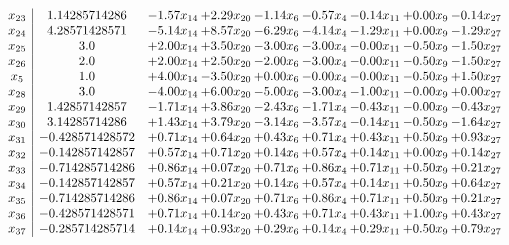 \documentclass[8pt]{article}
\begin{document}
\[\begin{array}{c| c c@{\hskip 2pt} c@{\hskip 2pt} c@{\hskip 2pt} c@{\hskip 2pt} c@{\hskip 2pt} c@{\hskip 2pt} c@{\hskip 2pt} }
 x_{23}   &  1.14285714286 & -1.57 x_{14} & +  2.29 x_{20} & -1.14 x_{6} & -0.57 x_{4} & -0.14 x_{11} & +  0.00 x_{9} & -0.14 x_{27}\\
 x_{24}   &  4.28571428571 & -5.14 x_{14} & +  8.57 x_{20} & -6.29 x_{6} & -4.14 x_{4} & -1.29 x_{11} & +  0.00 x_{9} & -1.29 x_{27}\\
 x_{25}   &  3.0 & +  2.00 x_{14} & +  3.50 x_{20} & -3.00 x_{6} & -3.00 x_{4} & -0.00 x_{11} & -0.50 x_{9} & -1.50 x_{27}\\
 x_{26}   &  2.0 & +  2.00 x_{14} & +  2.50 x_{20} & -2.00 x_{6} & -3.00 x_{4} & -0.00 x_{11} & -0.50 x_{9} & -1.50 x_{27}\\
 x_{5}   &  1.0 & +  4.00 x_{14} & -3.50 x_{20} & +  0.00 x_{6} & -0.00 x_{4} & -0.00 x_{11} & -0.50 x_{9} & +  1.50 x_{27}\\
 x_{28}   &  3.0 & -4.00 x_{14} & +  6.00 x_{20} & -5.00 x_{6} & -3.00 x_{4} & -1.00 x_{11} & -0.00 x_{9} & +  0.00 x_{27}\\
 x_{29}   &  1.42857142857 & -1.71 x_{14} & +  3.86 x_{20} & -2.43 x_{6} & -1.71 x_{4} & -0.43 x_{11} & -0.00 x_{9} & -0.43 x_{27}\\
 x_{30}   &  3.14285714286 & +  1.43 x_{14} & +  3.79 x_{20} & -3.14 x_{6} & -3.57 x_{4} & -0.14 x_{11} & -0.50 x_{9} & -1.64 x_{27}\\
 x_{31}   &  -0.428571428572 & +  0.71 x_{14} & +  0.64 x_{20} & +  0.43 x_{6} & +  0.71 x_{4} & +  0.43 x_{11} & +  0.50 x_{9} & +  0.93 x_{27}\\
 x_{32}   &  -0.142857142857 & +  0.57 x_{14} & +  0.71 x_{20} & +  0.14 x_{6} & +  0.57 x_{4} & +  0.14 x_{11} & +  0.00 x_{9} & +  0.14 x_{27}\\
 x_{33}   &  -0.714285714286 & +  0.86 x_{14} & +  0.07 x_{20} & +  0.71 x_{6} & +  0.86 x_{4} & +  0.71 x_{11} & +  0.50 x_{9} & +  0.21 x_{27}\\
 x_{34}   &  -0.142857142857 & +  0.57 x_{14} & +  0.21 x_{20} & +  0.14 x_{6} & +  0.57 x_{4} & +  0.14 x_{11} & +  0.50 x_{9} & +  0.64 x_{27}\\
 x_{35}   &  -0.714285714286 & +  0.86 x_{14} & +  0.07 x_{20} & +  0.71 x_{6} & +  0.86 x_{4} & +  0.71 x_{11} & +  0.50 x_{9} & +  0.21 x_{27}\\
 x_{36}   &  -0.428571428571 & +  0.71 x_{14} & +  0.14 x_{20} & +  0.43 x_{6} & +  0.71 x_{4} & +  0.43 x_{11} & +  1.00 x_{9} & +  0.43 x_{27}\\
 x_{37}   &  -0.285714285714 & +  0.14 x_{14} & +  0.93 x_{20} & +  0.29 x_{6} & +  0.14 x_{4} & +  0.29 x_{11} & +  0.50 x_{9} & +  0.79 x_{27}\\

\end{array}\]
\end{document}
